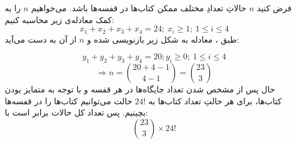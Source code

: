 \p
فرض کنید
$n$
حالاتِ تعدادِ مختلف ممکن کتاب‌ها در قفسه‌ها باشد.
می‌خواهیم
$n$
را به کمک معادله‌ی زیر محاسبه کنیم:
$$x_1+x_2+x_3+x_4=24;\: x_i\geq 1;\: 1\leq i\leq 4$$
طبق 
،
معادله به شکل زیر بازنویسی شده و 
$n$
از آن به دست می‌آید:

$$ y_1+y_2+y_3+y_4=20; y_i\geq 0;\: 1\leq i\leq 4$$
$$\Rightarrow n = {20+4-1 \choose 4-1} = {23 \choose 3}$$
حال پس از مشخص شدن تعداد جایگاه‌ها در هر قفسه و با توجه به متمایز بودن کتاب‌ها، برای هر حالتِ تعداد کتاب‌ها
 به 
$24!$
حالت می‌توانیم کتاب‌ها را در قفسه‌ها بچینیم.
پس تعداد کل حالات برابر است با:
$${23 \choose 3} \times 24!$$
